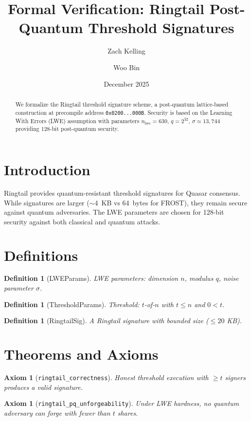 \documentclass[11pt]{article}
\title{Formal Verification: Ringtail Post-Quantum Threshold Signatures}
\author{Zach Kelling \and Woo Bin}
\date{December 2025}
\newtheorem{definition}[theorem]{Definition}
\newtheorem{axiom_stmt}[theorem]{Axiom}
\begin{document}
\maketitle

\begin{abstract}
We formalize the Ringtail threshold signature scheme, a post-quantum lattice-based construction at precompile address \texttt{0x0200...000B}. Security is based on the Learning With Errors (LWE) assumption with parameters $n_{\text{lwe}} = 630$, $q = 2^{32}$, $\sigma \approx 13{,}744$ providing 128-bit post-quantum security.
\end{abstract}

\section{Introduction}
Ringtail provides quantum-resistant threshold signatures for Quasar consensus. While signatures are larger ($\sim$4~KB vs 64~bytes for FROST), they remain secure against quantum adversaries. The LWE parameters are chosen for 128-bit security against both classical and quantum attacks.

\section{Definitions}
\begin{definition}[LWEParams]
LWE parameters: dimension $n$, modulus $q$, noise parameter $\sigma$.
\end{definition}

\begin{definition}[ThresholdParams]
Threshold: $t$-of-$n$ with $t \leq n$ and $0 < t$.
\end{definition}

\begin{definition}[RingtailSig]
A Ringtail signature with bounded size ($\leq 20$ KB).
\end{definition}


\section{Theorems and Axioms}
\begin{axiom_stmt}[\texttt{ringtail\_correctness}]
Honest threshold execution with $\geq t$ signers produces a valid signature.
\end{axiom_stmt}

\begin{axiom_stmt}[\texttt{ringtail\_pq\_unforgeability}]
Under LWE hardness, no quantum adversary can forge with fewer than $t$ shares.
\end{axiom_stmt}
\end{document}
